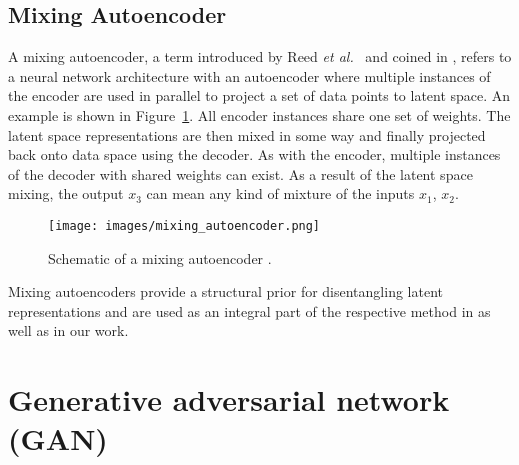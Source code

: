 \documentclass[a4paper,12pt]{report}
\begin{document}
\subsection{Mixing Autoencoder}\label{subsec:mixAE}
A mixing autoencoder, a term introduced by Reed \textit{et al.}~\cite{DeepVisAnaMak} and coined in \cite{DisentFacOfVarByMixTh}, refers to a neural network architecture with an autoencoder where multiple instances of the encoder are used in parallel to project a set of data points to latent space. An example is shown in Figure~\ref{fig:mixing_autoencoder}. All encoder instances share one set of weights. The latent space representations are then mixed in some way and finally projected back onto data space using the decoder. As with the encoder, multiple instances of the decoder with shared weights can exist. As a result of the latent space mixing, the output $x_3$ can mean any kind of mixture of the inputs $x_1$, $x_2$.
\begin{figure}[ht]
\centering
\texttt{[image: images/mixing\_autoencoder.png]}
\caption{Schematic of a mixing autoencoder \cite{DisentFacOfVarByMixTh}.}
\label{fig:mixing_autoencoder}
\end{figure}

Mixing autoencoders provide a structural prior for disentangling latent representations and are used as an integral part of the respective method in \cite{DisentFacOfVarByMixTh, DeepVisAnaMak} as well as in our work.


\section{Generative adversarial network (GAN)}
\end{document}
